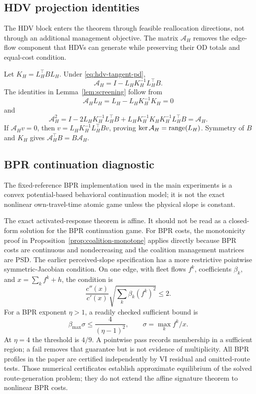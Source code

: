 \subsection{HDV projection identities}

The HDV block enters the theorem through feasible reallocation directions, not through an additional management objective. The matrix $\mathcal A_H$ removes the edge-flow component that HDVs can generate while preserving their OD totals and equal-cost condition.

Let $K_H=L_H^\top BL_H$. Under \eqref{eq:hdv-tangent-pd},
\[
 \mathcal A_H=I-L_HK_H^{-1}L_H^\top B.
\]
The identities in Lemma~\ref{lem:screening} follow from
\[
 \mathcal A_HL_H=L_H-L_HK_H^{-1}K_H=0
\]
and
\[
 \mathcal A_H^2
 =I-2L_HK_H^{-1}L_H^\top B
 +L_HK_H^{-1}K_HK_H^{-1}L_H^\top B
 =\mathcal A_H.
\]
If $\mathcal A_Hv=0$, then $v=L_HK_H^{-1}L_H^\top Bv$, proving $\ker\mathcal A_H=\operatorname{range}(L_H)$. Symmetry of $B$ and $K_H$ gives $\mathcal A_H^\top B=B\mathcal A_H$.

\subsection{BPR continuation diagnostic}

The fixed-reference BPR implementation used in the main experiments is a convex potential-based behavioral continuation model; it is not the exact nonlinear own-travel-time atomic game unless the physical slope is constant.

The exact activated-response theorem is affine. It should not be read as a closed-form solution for the BPR continuation game. For BPR costs, the monotonicity proof in Proposition~\ref{prop:coalition-monotone} applies directly because BPR costs are continuous and nondecreasing and the coalition management matrices are PSD. The earlier perceived-slope specification has a more restrictive pointwise symmetric-Jacobian condition. On one edge, with fleet flows $f^k$, coefficients $\beta_k$, and $x=\sum_kf^k+h$, the condition is
\begin{equation}\label{eq:bpr-exact-psd}
 \frac{c''(x)}{c'(x)}
 \sqrt{\sum_k\beta_k(f^k)^2}\leq2.
\end{equation}
For a BPR exponent $\eta>1$, a readily checked sufficient bound is
\begin{equation}\label{eq:bpr-coarse-psd}
 \beta_{\max}\sigma\leq\frac{4}{(\eta-1)^2},
 \qquad \sigma=\max_k f^k/x.
\end{equation}
At $\eta=4$ the threshold is $4/9$. A pointwise pass records membership in a sufficient region; a fail removes that guarantee but is not evidence of multiplicity. All BPR profiles in the paper are certified independently by VI residual and omitted-route tests. Those numerical certificates establish approximate equilibrium of the solved route-generation problem; they do not extend the affine signature theorem to nonlinear BPR costs.

